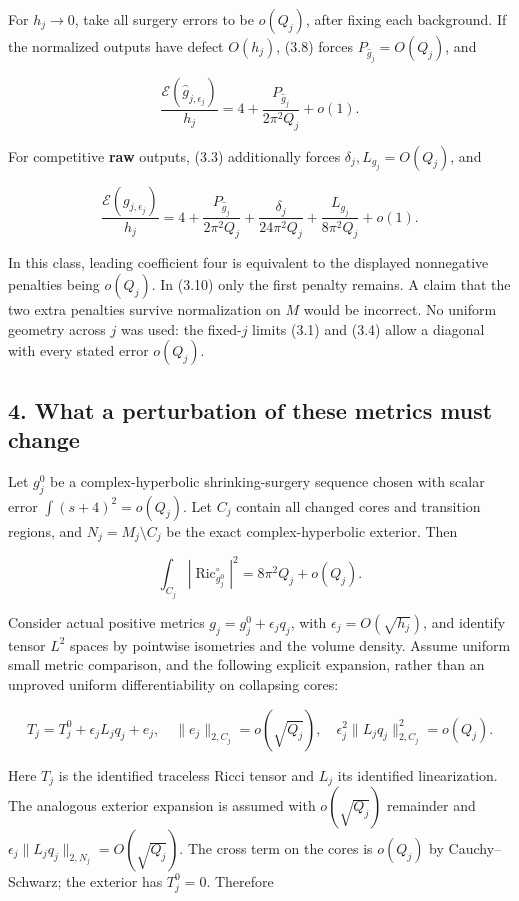 \documentclass[
  11pt,
]{article}
\begin{document}
For \(h_j\to0\), take all surgery errors to be \(o(Q_j)\), after fixing
each background. If the normalized outputs have defect \(O(h_j)\), (3.8)
forces \(P_{\widehat g_j}=O(Q_j)\), and

\[
 \boxed{\frac{\mathcal E(\widehat g_{j,\epsilon_j})}{h_j}
 =4+\frac{P_{\widehat g_j}}{2\pi^2Q_j}+o(1).} \tag{3.10}
\]

For competitive \textbf{raw} outputs, (3.3) additionally forces
\(\delta_j,L_{g_j}=O(Q_j)\), and

\[
 \frac{\mathcal E(g_{j,\epsilon_j})}{h_j}
 =4+\frac{P_{\widehat g_j}}{2\pi^2Q_j}
      +\frac{\delta_j}{24\pi^2Q_j}
      +\frac{L_{g_j}}{8\pi^2Q_j}+o(1). \tag{3.11}
\]

In this class, leading coefficient four is equivalent to the displayed
nonnegative penalties being \(o(Q_j)\). In (3.10) only the first penalty
remains. A claim that the two extra penalties survive normalization on
\(M\) would be incorrect. No uniform geometry across \(j\) was used: the
fixed-\(j\) limits (3.1) and (3.4) allow a diagonal with every stated
error \(o(Q_j)\).

\hypertarget{what-a-perturbation-of-these-metrics-must-change}{%
\subsection{4. What a perturbation of these metrics must
change}\label{what-a-perturbation-of-these-metrics-must-change}}

Let \(g_j^0\) be a complex-hyperbolic shrinking-surgery sequence chosen
with scalar error \(\int(s+4)^2=o(Q_j)\). Let \(C_j\) contain all
changed cores and transition regions, and \(N_j=M_j\setminus C_j\) be
the exact complex-hyperbolic exterior. Then

\[
 \int_{C_j}|\operatorname{Ric}_{g_j^0}^{\circ}|^2
                    =8\pi^2Q_j+o(Q_j).
\]

Consider actual positive metrics \(g_j=g_j^0+\epsilon_j q_j\), with
\(\epsilon_j=O(\sqrt{h_j})\), and identify tensor \(L^2\) spaces by
pointwise isometries and the volume density. Assume uniform small metric
comparison, and the following explicit expansion, rather than an
unproved uniform differentiability on collapsing cores:

\[
 T_j=T_j^0+\epsilon_j L_jq_j+e_j,\quad
 \|e_j\|_{2,C_j}=o(\sqrt{Q_j}),
 \quad\epsilon_j^2\|L_jq_j\|_{2,C_j}^2=o(Q_j).
 \tag{4.1}
\]

Here \(T_j\) is the identified traceless Ricci tensor and \(L_j\) its
identified linearization. The analogous exterior expansion is assumed
with \(o(\sqrt{Q_j})\) remainder and
\(\epsilon_j\|L_jq_j\|_{2,N_j}=O(\sqrt{Q_j})\). The cross term on the
cores is \(o(Q_j)\) by Cauchy--Schwarz; the exterior has \(T_j^0=0\).
Therefore
\end{document}
